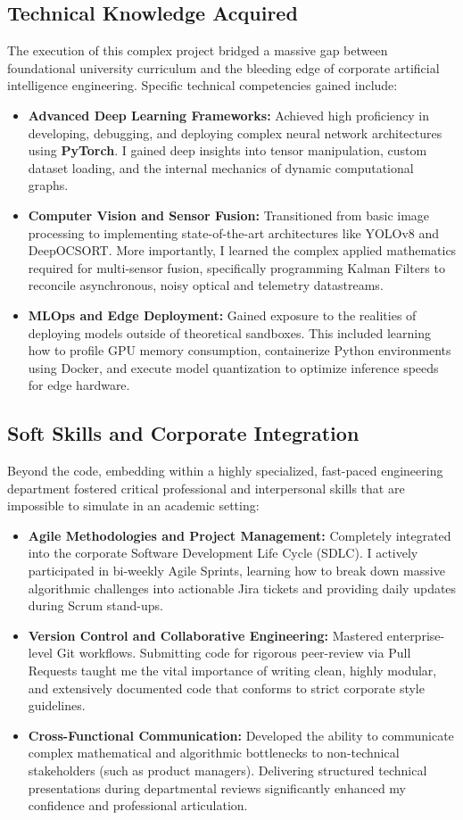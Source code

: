 \subsection{Technical Knowledge Acquired}
The execution of this complex project bridged a massive gap between foundational university curriculum and the bleeding edge of corporate artificial intelligence engineering. Specific technical competencies gained include:
\begin{itemize}
    \item \textbf{Advanced Deep Learning Frameworks:} Achieved high proficiency in developing, debugging, and deploying complex neural network architectures using \textbf{PyTorch}. I gained deep insights into tensor manipulation, custom dataset loading, and the internal mechanics of dynamic computational graphs.
    \item \textbf{Computer Vision and Sensor Fusion:} Transitioned from basic image processing to implementing state-of-the-art architectures like YOLOv8 and DeepOCSORT. More importantly, I learned the complex applied mathematics required for multi-sensor fusion, specifically programming Kalman Filters to reconcile asynchronous, noisy optical and telemetry datastreams.
    \item \textbf{MLOps and Edge Deployment:} Gained exposure to the realities of deploying models outside of theoretical sandboxes. This included learning how to profile GPU memory consumption, containerize Python environments using Docker, and execute model quantization to optimize inference speeds for edge hardware.
\end{itemize}

\subsection{Soft Skills and Corporate Integration}
Beyond the code, embedding within a highly specialized, fast-paced engineering department fostered critical professional and interpersonal skills that are impossible to simulate in an academic setting:
\begin{itemize}
    \item \textbf{Agile Methodologies and Project Management:} Completely integrated into the corporate Software Development Life Cycle (SDLC). I actively participated in bi-weekly Agile Sprints, learning how to break down massive algorithmic challenges into actionable Jira tickets and providing daily updates during Scrum stand-ups.
    \item \textbf{Version Control and Collaborative Engineering:} Mastered enterprise-level Git workflows. Submitting code for rigorous peer-review via Pull Requests taught me the vital importance of writing clean, highly modular, and extensively documented code that conforms to strict corporate style guidelines.
    \item \textbf{Cross-Functional Communication:} Developed the ability to communicate complex mathematical and algorithmic bottlenecks to non-technical stakeholders (such as product managers). Delivering structured technical presentations during departmental reviews significantly enhanced my confidence and professional articulation.
\end{itemize}

